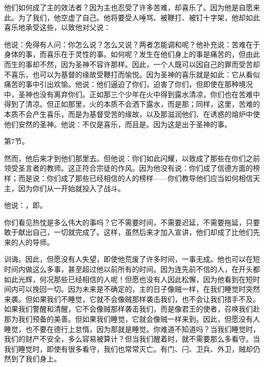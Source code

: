 他们如何成了主的效法者？因为主也忍受了许多苦难，却喜乐了。因为他是自愿来此。为了我们，他空虚了自己。他将要受人唾骂、被鞭打、被钉十字架，他却如此喜乐地承受这些，以致他对父说：\par

他说：免得有人问：你怎么说？怎么又说？两者怎能调和呢？他补充说：苦难在于身体的事，而喜乐在于灵性的事。如何呢？发生在他们身上的事是痛苦的，但由此而生的事却不然，因为圣神不容许那样。因此，一个人既可以因自己的罪而受苦却不喜乐，也可以为基督的缘故受鞭打而愉悦。因为圣神的喜乐就是如此：它从看似痛苦的事中引出欢愉。他说：他们逼迫了你们，迫害了你们，但即使在那种境况中，圣神也没有离弃你们。正如那三个少年在火中得到露水清凉，你们也在苦难中得到了清凉。但正如那里，火的本质不会洒下露水，而是那；同样，这里，苦难的本质不会产生喜乐，而是为基督受苦的缘故，以及那滋润他们、在诱惑的熔炉中使他们安然的圣神。他说：不仅是喜乐，而且是。因为这是出于圣神的事。\par

第7节。\par

然而，他后来才到他们那里去。但他说：你们如此闪耀，以致成了那些在你们之前领受圣言者的教师。这正符合宗徒的作风。因为他没有说：你们成了信德方面的榜样；而是说：你们成了那些已经相信的人的榜样——你们教导他们应当如何相信天主，因为你们从一开始就投入了战斗。\par

他说：，即。\par

你们看见热忱是多么伟大的事吗？它不需要时间，不需要迟延，不需要拖延，只要敢于献出自己，一切就完成了。这样，虽然后来才加入宣讲，他们却成了比他们先来的人的导师。\par

训诲。因此，但愿没有人失望，即使他荒废了许多时间，一事无成。他也可以在短时间内做这么多事，甚至超过他以前所有的时间。因为连先前不信的人，在开头都如此光辉，何况那些已经相信的人呢！但愿也没有人因此松懈，因为他看到在短时间内可以挽回一切。因为未来是不确定的，主的日子像贼一样，在我们睡觉时突然来袭。但如果我们不睡觉，它就不会像贼那样袭击我们，也不会让我们措手不及。如果我们警醒和清醒，它不会像贼那样袭击我们，而是像君王的使者，召唤我们赴那为我们预备的美善。但如果我们睡觉，它就会像贼一样来到。因此，但愿没有人睡觉，也不要在德行上怠惰，因为那就是睡觉。你难道不知道吗？当我们睡觉时，我们的财产不安全，多么容易被算计？但当我们醒着时，就不需要那么多看守。当我们睡觉时，即使有很多看守，我们也常常灭亡。有门、闩、卫兵、外卫，贼却仍然到了我们身上。\par

